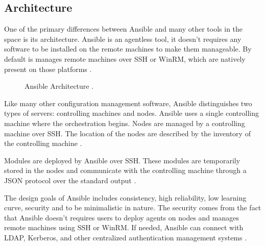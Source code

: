 \documentclass[9pt,twocolumn,twoside]{../../styles/osajnl}
\begin{document}
\subsection{Architecture}

One of the primary differences between Ansible and many other tools in
the space is its architecture. Ansible is an agentless tool, it
doesn't requires any software to be installed on the remote machines
to make them manageable. By default is manages remote machines over
SSH or WinRM, which are natively present on those
platforms \cite{www-ansible}.

\begin{figure}[htbp]
\centering
{}
\caption{Ansible Architecture \cite{www-ansible-arch-pic}.}
\label{fig:false-color}
\end{figure}

Like many other configuration management software, Ansible
distinguishes two types of servers: controlling machines and
nodes. Ansible uses a single controlling machine where the
orchestration begins. Nodes are managed by a controlling machine over
SSH. The location of the nodes are described by the inventory of the
controlling machine \cite{www-ansible3}.

Modules are deployed by Ansible over SSH. These modules are
temporarily stored in the nodes and communicate with the controlling
machine through a JSON protocol over the standard
output \cite{www-ansible}.

The design  goals of  Ansible includes consistency,  high reliability,
low learning  curve, security  and to be  minimalistic in  nature. The
security comes  from the fact  that Ansible doesn't requires  users to
deploy  agents on  nodes  and  manages remote  machines  using SSH  or
WinRM. If needed,  Ansible can connect with LDAP,  Kerberos, and other
centralized authentication management systems \cite{www-ansible2}.
\end{document}
